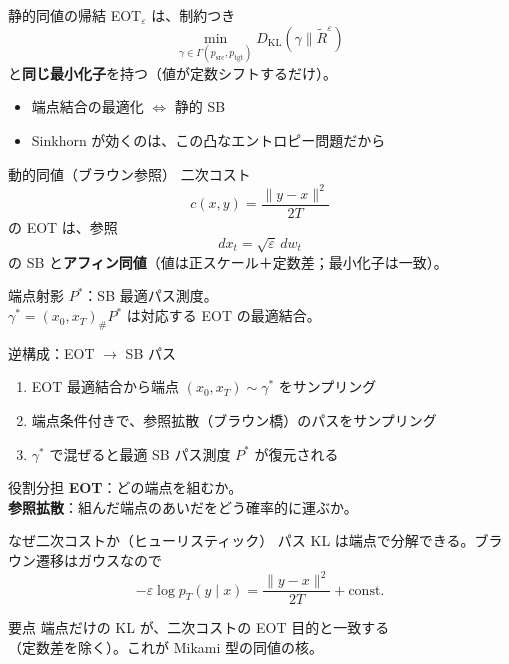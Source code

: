 \asmain
\begin{frame}{静的同値の帰結}
    EOT$_\varepsilon$ は、制約つき
    \[
        \min_{\gamma\in\Gamma(p_{\mathrm{src}},p_{\mathrm{tgt}})}
        D_{\mathrm{KL}}(\gamma\|\widetilde R^\varepsilon)
    \]
    と\textbf{同じ最小化子}を持つ（値が定数シフトするだけ）。
    \begin{itemize}
        \item 端点結合の最適化 $\Leftrightarrow$ 静的 SB
        \item Sinkhorn が効くのは、この凸なエントロピー問題だから
    \end{itemize}
\end{frame}
\asmain
\begin{frame}{動的同値（ブラウン参照）}
    二次コスト
    \[
        c(x,y)=\frac{\|y-x\|^2}{2T}
    \]
    の EOT は、参照
    \[
        dx_t=\sqrt{\varepsilon}\,dw_t
    \]
    の SB と\textbf{アフィン同値}（値は正スケール＋定数差；最小化子は一致）。
    \begin{block}{端点射影}
        $P^*$：SB 最適パス測度。\\
        $\gamma^*=(x_0,x_T)_{\#}P^*$ は対応する EOT の最適結合。
    \end{block}
\end{frame}
\asmain
\begin{frame}{逆構成：EOT $\to$ SB パス}
    \begin{enumerate}
        \item EOT 最適結合から端点 $(x_0,x_T)\sim\gamma^*$ をサンプリング
        \item 端点条件付きで、参照拡散（ブラウン橋）のパスをサンプリング
        \item $\gamma^*$ で混ぜると最適 SB パス測度 $P^*$ が復元される
    \end{enumerate}
    \begin{exampleblock}{役割分担}
        \textbf{EOT}：どの端点を組むか。\\
        \textbf{参照拡散}：組んだ端点のあいだをどう確率的に運ぶか。
    \end{exampleblock}
\end{frame}
\asmain
\begin{frame}{なぜ二次コストか（ヒューリスティック）}
    パス KL は端点で分解できる。ブラウン遷移はガウスなので
    \[
        -\varepsilon\log p_T(y\mid x)
        =
        \frac{\|y-x\|^2}{2T}
        +
        \mathrm{const}.
    \]
    \begin{alertblock}{要点}
        端点だけの KL が、二次コストの EOT 目的と一致する\\
        （定数差を除く）。これが Mikami 型の同値の核。
    \end{alertblock}
\end{frame}
